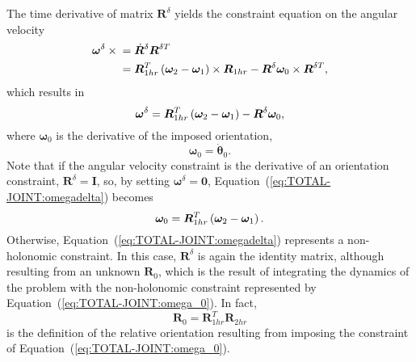 \documentclass[10pt,fleqn,subeqn]{report}
\newcommand{\T}[1]{\bm{#1}}
\begin{document}
The time derivative of matrix $\T{R}^{\delta}$ yields
the constraint equation on the angular velocity
\begin{align}
	\T{\omega}^{\delta}\times{}
	&= \dot{\T{R}}^{\delta} \T{R}^{\delta T} \nonumber \\
	&= \T{R}_{1hr}^T \plbr{
		\T{\omega}_2 - \T{\omega}_1
	} \times \T{R}_{1hr}
	- \T{R}^{\delta} \T{\omega}_0 \times \T{R}^{\delta T},
\end{align}
which results in
\begin{equation}
	\T{\omega}^{\delta} = \T{R}_{1hr}^T \plbr{
		\T{\omega}_2 - \T{\omega}_1
	} - \T{R}^{\delta} \T{\omega}_0 ,
	\label{eq:TOTAL-JOINT:omegadelta}
\end{equation}
where $\T{\omega}_0$ is the derivative of the imposed orientation,
\begin{equation}
	\T{\omega}_0 = \dot{\T{\theta}}_0 .
\end{equation}
Note that if the angular velocity constraint 
is the derivative of an orientation constraint, $\T{R}^{\delta}=\T{I}$,
so, by setting $\T{\omega}^{\delta}=\T{0}$,
Equation~(\ref{eq:TOTAL-JOINT:omegadelta}) becomes
\begin{equation}
	\T{\omega}_0 = \T{R}_{1hr}^T \plbr{
		\T{\omega}_2 - \T{\omega}_1
	} .
	\label{eq:TOTAL-JOINT:omega_0}
\end{equation}
Otherwise, Equation~(\ref{eq:TOTAL-JOINT:omegadelta}) represents
a non-holonomic constraint.
In this case, $\T{R}^{\delta}$ is again the identity matrix, although
resulting from an unknown $\T{R}_0$, which is the result of integrating
the dynamics of the problem with the non-holonomic constraint represented
by Equation~(\ref{eq:TOTAL-JOINT:omega_0}).
In fact,
\begin{equation}
	\T{R}_0 = \T{R}_{1hr}^T \T{R}_{2hr}
\end{equation}
is the definition of the relative orientation resulting from 
imposing the constraint of Equation~(\ref{eq:TOTAL-JOINT:omega_0}).
\end{document}
